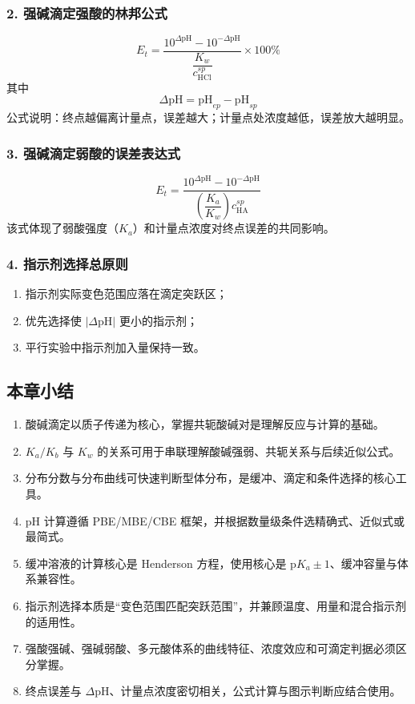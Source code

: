 \documentclass[12pt,a4paper]{article}
\numberwithin{equation}{section}
\newcommand{\summarytitle}{\subsection*{本章小结}}
\begin{document}
\subsubsection{2. 强碱滴定强酸的林邦公式}
\begin{equation}
E_t=\frac{10^{\Delta \mathrm{pH}}-10^{-\Delta \mathrm{pH}}}{\dfrac{K_w}{c_{\mathrm{HCl}}^{sp}}}\times 100\%
\end{equation}
其中
\begin{equation}
\Delta \mathrm{pH}=\mathrm{pH}_{ep}-\mathrm{pH}_{sp}
\end{equation}
公式说明：终点越偏离计量点，误差越大；计量点处浓度越低，误差放大越明显。

\subsubsection{3. 强碱滴定弱酸的误差表达式}
\begin{equation}
E_t=\frac{10^{\Delta \mathrm{pH}}-10^{-\Delta \mathrm{pH}}}{\left(\dfrac{K_a}{K_w}\right)c_{\mathrm{HA}}^{sp}}
\end{equation}
该式体现了弱酸强度（$K_a$）和计量点浓度对终点误差的共同影响。

\subsubsection{4. 指示剂选择总原则}
\begin{enumerate}
    \item 指示剂实际变色范围应落在滴定突跃区；
    \item 优先选择使 $|\Delta \mathrm{pH}|$ 更小的指示剂；
    \item 平行实验中指示剂加入量保持一致。
\end{enumerate}

\summarytitle
\begin{enumerate}
    \item 酸碱滴定以质子传递为核心，掌握共轭酸碱对是理解反应与计算的基础。
    \item $K_a/K_b$ 与 $K_w$ 的关系可用于串联理解酸碱强弱、共轭关系与后续近似公式。
    \item 分布分数与分布曲线可快速判断型体分布，是缓冲、滴定和条件选择的核心工具。
    \item pH 计算遵循 PBE/MBE/CBE 框架，并根据数量级条件选精确式、近似式或最简式。
    \item 缓冲溶液的计算核心是 Henderson 方程，使用核心是 $\mathrm{p}K_a\pm 1$、缓冲容量与体系兼容性。
    \item 指示剂选择本质是“变色范围匹配突跃范围”，并兼顾温度、用量和混合指示剂的适用性。
    \item 强酸强碱、强碱弱酸、多元酸体系的曲线特征、浓度效应和可滴定判据必须区分掌握。
    \item 终点误差与 $\Delta\mathrm{pH}$、计量点浓度密切相关，公式计算与图示判断应结合使用。
\end{enumerate}
\end{document}
